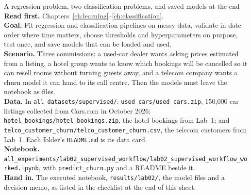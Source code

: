 
\begin{labproject}{A regression problem, two classification problems, and saved models at the end}
\textbf{Read first.} Chapters~\ref{ch:learning}--\ref{ch:classification}.\\
\textbf{Goal.} Fit regression and classification pipelines on messy data, validate in date order where time matters, choose thresholds and hyperparameters on purpose, test once, and save models that can be loaded and used.\\
\textbf{Scenario.} Three commissions: a used-car dealer wants asking prices estimated from a listing, a hotel group wants to know which bookings will be cancelled so it can resell rooms without turning guests away, and a telecom company wants a churn model it can hand to its call centre. Then the models must leave the notebook as files.\\
\textbf{Data.} In \texttt{all\_datasets/\allowbreak supervised/}: \texttt{used\_cars/\allowbreak used\_cars.zip}, 150,000 car listings collected from Cars.com in October 2026; \texttt{hotel\_bookings/\allowbreak hotel\_bookings.zip}, the hotel bookings from Lab~1; and \texttt{telco\_customer\_churn/\allowbreak telco\_customer\_churn.csv}, the telecom customers from Lab~1. Each folder's \texttt{README.md} is its data card.\\
\textbf{Notebook.} \texttt{all\_experiments/\allowbreak lab02\_supervised\_workflow/\allowbreak lab02\_supervised\_workflow\_worked.ipynb}, with \texttt{predict\_churn.py} and a README beside it.\\
\textbf{Hand in.} The executed notebook, \texttt{results/lab02/}, the model files and a decision memo, as listed in the checklist at the end of this sheet.
\end{labproject}


